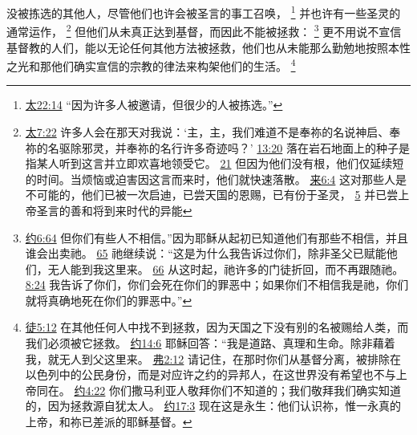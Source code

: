 \documentclass[12pt, a4paper, oneside]{ctexart}
\newcounter{parnum}[section]
\newcommand{\N}{%
   \noindent\refstepcounter{parnum}%
    \makebox[\parindent][l]{\textbf{\arabic{parnum}.}}}
\begin{document}
\N 没被拣选的其他人，尽管他们也许会被圣言的事工召唤，
	\footnote {
		\href{https://biblehub.com/matthew/22-14.htm}{太22:14} “因为许多人被邀请，但很少的人被拣选。”
	}
	并也许有一些圣灵的通常运作，
	\footnote {
		\href{https://biblehub.com/matthew/7-22.htm}{太7:22} 许多人会在那天对我说：‘主，主，我们难道不是奉祢的名说神启、奉祢的名驱除邪灵，并奉祢的名行许多奇迹吗？’
		\href{https://biblehub.com/matthew/13-20.htm}{13:20} 落在岩石地面上的种子是指某人听到这言并立即欢喜地领受它。
		\href{https://biblehub.com/matthew/13-21.htm}{21} 但因为他们没有根，他们仅延续短的时间。当烦恼或迫害因这言而来时，他们就快速落散。
		\href{https://biblehub.com/hebrews/6-4.htm}{来6:4} 这对那些人是不可能的，他们已被一次启迪，已尝天国的恩赐，已有份于圣灵，
		\href{https://biblehub.com/hebrews/6-5.htm}{5} 并已尝上帝圣言的善和将到来时代的异能
	}
	但他们从未真正达到基督，而因此不能被拯救：
	\footnote {
		\href{https://biblehub.com/john/6-64.htm}{约6:64} 但你们有些人不相信。”因为耶稣从起初已知道他们有那些不相信，并且谁会出卖祂。
		\href{https://biblehub.com/john/6-65.htm}{65} 祂继续说：“这是为什么我告诉过你们，除非圣父已赋能他们，无人能到我这里来。
		\href{https://biblehub.com/john/6-66.htm}{66} 从这时起，祂许多的门徒折回，而不再跟随祂。
		\href{https://biblehub.com/john/8-24.htm}{8:24} 我告诉了你们，你们会死在你们的罪恶中；如果你们不相信我是祂，你们就将真确地死在你们的罪恶中。”
	}
	更不用说不宣信基督教的人们，能以无论任何其他方法被拯救，他们也从未能那么勤勉地按照本性之光和那他们确实宣信的宗教的律法来构架他们的生活。
	\footnote {
		\href{https://biblehub.com/acts/4-12.htm}{徒5:12} 在其他任何人中找不到拯救，因为天国之下没有别的名被赐给人类，而我们必须被它拯救。
		\href{https://biblehub.com/john/14-6.htm}{约14:6} 耶稣回答：“我是道路、真理和生命。除非藉着我，就无人到父这里来。
		\href{https://biblehub.com/ephesians/2-12.htm}{弗2:12} 请记住，在那时你们从基督分离，被排除在以色列中的公民身份，而是对应许之约的异邦人，在这世界没有希望也不与上帝同在。
		\href{https://biblehub.com/john/4-22.htm}{约4:22} 你们撒马利亚人敬拜你们不知道的；我们敬拜我们确实知道的，因为拯救源自犹太人。
		\href{https://biblehub.com/john/17-3.htm}{约17:3} 现在这是永生：他们认识祢，惟一永真的上帝，和祢已差派的耶稣基督。
	}
\end{document}
